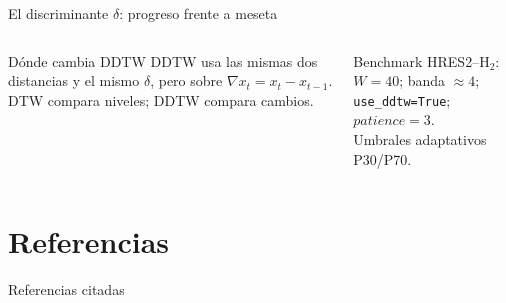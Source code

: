 \documentclass[aspectratio=169,11pt]{beamer}
\begin{document}
\begin{frame}{El discriminante $\delta$: progreso frente a meseta}
\begin{columns}[T,onlytextwidth]
      \begin{block}{Dónde cambia DDTW}
        \scriptsize
        DDTW usa las mismas dos distancias y el mismo $\delta$, pero sobre
        $\nabla x_t=x_t-x_{t-1}$. DTW compara niveles; DDTW compara cambios.
      \end{block}

      {\tiny Benchmark HRES2--H$_2$: $W=40$; banda $\approx4$; \texttt{use\_ddtw=True}; $patience=3$.\\
      Umbrales adaptativos P30/P70.}

  \end{columns}
\end{frame}

\section{Referencias}
\begin{frame}[allowframebreaks]{Referencias citadas}
  \tiny
  \nocite{wolpert1997no,vega2021learning,akbulut2026artificial,talbi2021machine_tax,
    pei2025adaptive,adriaensen2022automated,jankovic2022trajectory,
    kostovska2022per,cenikj2026survey,berndt1994using,keogh2001derivative,
    mambrini2015design,liu2025three,reijnen2025search}
  \printbibliography[heading=none]
\end{frame}
\end{document}
